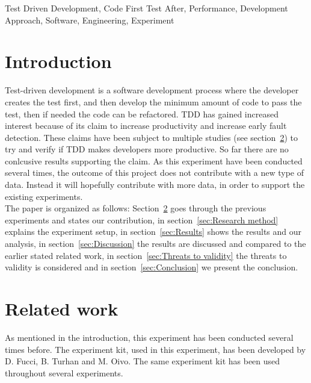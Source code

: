 \documentclass{sig-alternate-05-2015}
\begin{document}


%
%

%
%
\printccsdesc

\begin{keywords}
Test Driven Development, Code First Test After, Performance, Development Approach, Software, Engineering, \newline Experiment
\end{keywords}


\section{Introduction}
Test-driven development is a software development process where the developer creates the test first, and then develop the minimum amount of code to pass the test, then if needed the code can be refactored\cite{beck1}. TDD has gained increased interest because of its claim to increase productivity and increase early fault detection\cite{astels1}. These claims have been subject to multiple studies (see section~\ref{sec:Related work}) to try and verify if TDD makes developers more productive. So far there are no conlcusive results supporting the claim\cite{shull1}.
As this experiment have been conducted several times, the outcome of this project does not contribute with a new type of data. Instead it will hopefully contribute with more data, in order to support the existing experiments.\\

The paper is organized as follows: Section~\ref{sec:Related work} goes through the previous experiments and states our contribution, in section~\ref{sec:Research method} explains the experiment setup, in section~\ref{sec:Results} shows the results and our analysis, in section~\ref{sec:Discussion} the results are discussed and compared to the earlier stated related work, in section~\ref{sec:Threats to validity} the threats to validity is considered and in section~\ref{sec:Conclusion} we present the conclusion. 

\section{Related work}
\label{sec:Related work}
As mentioned in the introduction, this experiment has been conducted several times before. The experiment kit, used in this experiment, has been developed by D. Fucci, B. Turhan and M. Oivo. The same experiment kit has been used throughout several experiments.
\end{document}

